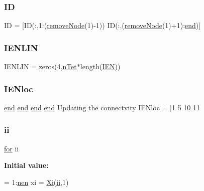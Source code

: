\subsubsection{\texorpdfstring{ID}{ID}}
{\footnotesize\ttfamily ID = \mbox{[}ID(\+:,1\+:(\hyperlink{a00605_ae344a0a545940b078e36623bf4b44c7f}{remove\+Node}(1)-\/1)) ID(\+:,(\hyperlink{a00605_ae344a0a545940b078e36623bf4b44c7f}{remove\+Node}(1)+1)\+:\hyperlink{a00608_afb358f48b1646c750fb9da6c6585be2b}{end})\mbox{]}}

\mbox{\label{a00605_a924f6afb8fc3a0c028349f92c93d4f22}} 
\subsubsection{\texorpdfstring{I\+E\+N\+L\+IN}{IENLIN}}
{\footnotesize\ttfamily I\+E\+N\+L\+IN = zeros(4,\hyperlink{a00605_a9e9784c690cbc435d91a2c0b5f2fea1c}{n\+Tet}$\ast$length(\hyperlink{a00608_ada37e689768b959686f183a3d534464b}{I\+EN}))}

\mbox{\label{a00605_ae3396d631c6896e8f9cb538bbd562cd6}} 
\subsubsection{\texorpdfstring{I\+E\+Nloc}{IENloc}}
{\footnotesize\ttfamily \hyperlink{a00608_afb358f48b1646c750fb9da6c6585be2b}{end} \hyperlink{a00608_afb358f48b1646c750fb9da6c6585be2b}{end} \hyperlink{a00608_afb358f48b1646c750fb9da6c6585be2b}{end} \hyperlink{a00608_afb358f48b1646c750fb9da6c6585be2b}{end} Updating the connectvity I\+E\+Nloc = \mbox{[}1 5 10 11}

\mbox{\label{a00605_abf9d47cd7d4fbc942e618bb1977019c2}} 
\subsubsection{\texorpdfstring{ii}{ii}}
{\footnotesize\ttfamily \hyperlink{a00623_ad1e7380d51df1e0043d24d3c8a860e0a}{for} ii}

{\bfseries Initial value\+:}
\begin{DoxyCode}
= 1:\hyperlink{a00605_acbbc42389c3587d1280ad7f1322035ba}{nen}
    xi = \hyperlink{a00605_a34d6ec2e729af94d4261c2243a358e05}{Xi}(\hyperlink{a00605_abf9d47cd7d4fbc942e618bb1977019c2}{ii},1)
\end{DoxyCode}
\mbox{\label{a00605_a74556944edc5b1cde67a5d60a6aaf7b3}} 
